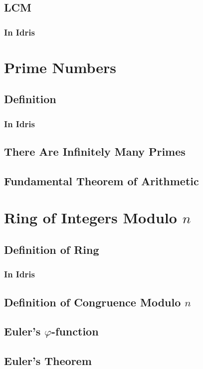 \documentclass{article}
\begin{document}
\subsection{LCM}
\subsubsection{In Idris}

\section{Prime Numbers}
\subsection{Definition}
\subsubsection{In Idris}

\subsection{There Are Infinitely Many Primes}

\subsection{Fundamental Theorem of Arithmetic}

\section{Ring of Integers Modulo $n$}
\subsection{Definition of Ring}
\subsubsection{In Idris}

\subsection{Definition of Congruence Modulo $n$}

\subsection{Euler's $\varphi$-function}

\subsection{Euler's Theorem}
\end{document}
